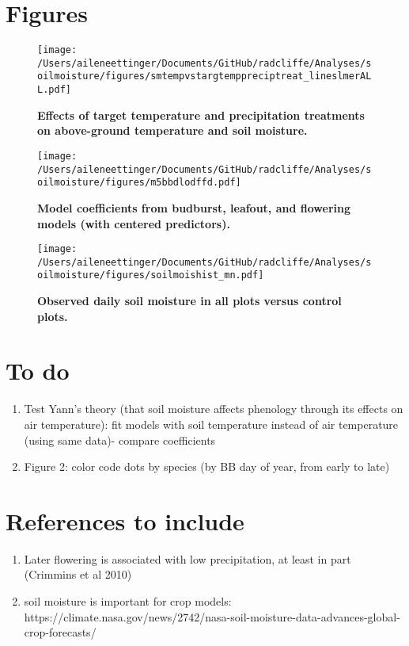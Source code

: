 \documentclass{article}
\begin{document}
\clearpage
\section* {Figures}
\clearpage
 \begin{figure}[h]
\centering
 \texttt{[image: /Users/aileneettinger/Documents/GitHub/radcliffe/Analyses/soilmoisture/figures/smtempvstargtemppreciptreat\_lineslmerALL.pdf]}
 \caption{\textbf{Effects of target temperature and precipitation treatments on above-ground temperature and soil moisture.}} 
 \label{fig:soilmois}
 \end{figure}

\begin{figure}[h]
\centering
 \texttt{[image: /Users/aileneettinger/Documents/GitHub/radcliffe/Analyses/soilmoisture/figures/m5bbdlodffd.pdf]}
 \caption{\textbf{Model coefficients from budburst, leafout, and flowering models (with centered predictors).}} 
 \label{fig:bb}
 \end{figure}

\begin{figure}[h]
\centering
 \texttt{[image: /Users/aileneettinger/Documents/GitHub/radcliffe/Analyses/soilmoisture/figures/soilmoishist\_mn.pdf]}
 \caption{\textbf{Observed daily soil moisture in all plots versus control plots.}} 
 \label{fig:sm}
 \end{figure}

\section* {To do}
\begin{enumerate}
\item Test Yann's theory (that soil moisture affects phenology through its effects on air temperature): fit models with soil temperature instead of air temperature (using same data)- compare coefficients

\item Figure 2: color code dots by species (by BB day of year, from early to late)
\end{enumerate}
\section*{References to include}
\begin{enumerate}
\item Later flowering is  associated with low precipitation, at least in part (Crimmins et al 2010)
\item soil moisture is important for crop models: https://climate.nasa.gov/news/2742/nasa-soil-moisture-data-advances-global-crop-forecasts/


\end{enumerate}
\end{document}
